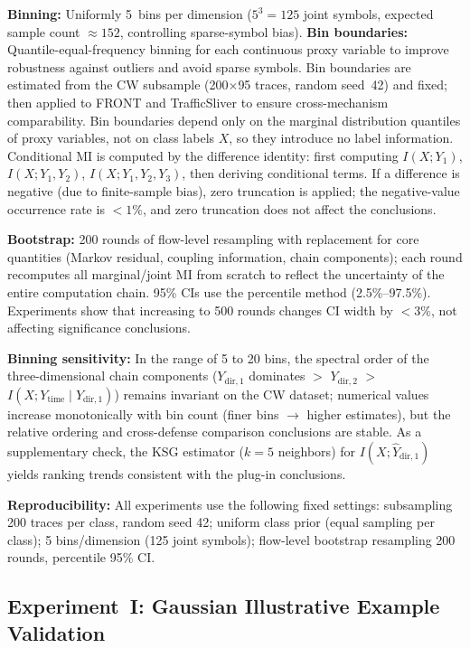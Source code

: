 \documentclass[lettersize,journal]{IEEEtran}
\begin{document}
\textbf{Binning:} Uniformly 5~bins per dimension ($5^3=125$ joint symbols,
expected sample count $\approx 152$, controlling sparse-symbol bias).
\textbf{Bin boundaries:} Quantile-equal-frequency binning for each continuous
proxy variable to improve robustness against outliers and avoid sparse symbols.
Bin boundaries are estimated from the CW subsample (200$\times$95 traces,
random seed~42) and fixed; then applied to FRONT and TrafficSliver to ensure
cross-mechanism comparability.
Bin boundaries depend only on the marginal distribution quantiles of proxy
variables, not on class labels $X$, so they introduce no label information.
Conditional MI is computed by the difference identity:
first computing $I(X;Y_1)$, $I(X;Y_1,Y_2)$, $I(X;Y_1,Y_2,Y_3)$,
then deriving conditional terms.
If a difference is negative (due to finite-sample bias), zero truncation
is applied; the negative-value occurrence rate is $<1\%$, and zero truncation
does not affect the conclusions.

\textbf{Bootstrap:} 200 rounds of flow-level resampling with replacement
for core quantities (Markov residual, coupling information, chain components);
each round recomputes all marginal/joint MI from scratch to reflect the
uncertainty of the entire computation chain.
95\% CIs use the percentile method (2.5\%--97.5\%).
Experiments show that increasing to 500 rounds changes CI width by
$<3\%$, not affecting significance conclusions.

\textbf{Binning sensitivity:} In the range of 5 to 20 bins, the spectral
order of the three-dimensional chain components
($Y_{\mathrm{dir},1}$ dominates $>$ $Y_{\mathrm{dir},2}$ $>$
$I(X;Y_{\mathrm{time}}\mid Y_{\mathrm{dir},1})$)
remains invariant on the CW dataset; numerical values increase
monotonically with bin count (finer bins $\to$ higher estimates), but the
relative ordering and cross-defense comparison conclusions are stable.
As a supplementary check, the KSG estimator ($k=5$ neighbors) for
$I(X;\hat{Y}_{\mathrm{dir},1})$ yields ranking trends consistent with the
plug-in conclusions.

\textbf{Reproducibility:} All experiments use the following fixed settings:
subsampling 200 traces per class, random seed 42; uniform class prior
(equal sampling per class); 5 bins/dimension (125 joint symbols);
flow-level bootstrap resampling 200 rounds, percentile 95\% CI.

\subsection{Experiment~I: Gaussian Illustrative Example Validation}
\end{document}
